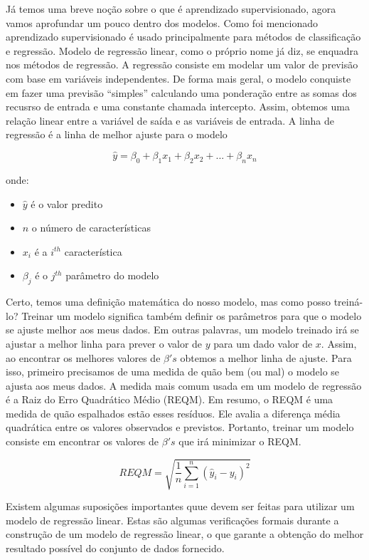 \documentclass[
  letterpaper,
  DIV=11,
  numbers=noendperiod]{scrreprt}
\begin{document}
Já temos uma breve noção sobre o que é aprendizado supervisionado, agora
vamos aprofundar um pouco dentro dos modelos. Como foi mencionado
aprendizado supervisionado é usado principalmente para métodos de
classificação e regressão. Modelo de regressão linear, como o próprio
nome já diz, se enquadra nos métodos de regressão. A regressão consiste
em modelar um valor de previsão com base em variáveis independentes. De
forma mais geral, o modelo conquiste em fazer uma previsão ``simples''
calculando uma ponderação entre as somas dos recusrso de entrada e uma
constante chamada intercepto. Assim, obtemos uma relação linear entre a
variável de saída e as variáveis de entrada. A linha de regressão é a
linha de melhor ajuste para o modelo

\[
\hat y = \beta_0 + \beta_1x_1 + \beta_2x_2 + ...+ \beta_nx_n
\]

onde:

\begin{itemize}
\item
  \(\hat y\) é o valor predito
\item
  \(n\) o número de características
\item
  \(x_i\) é a \(i^{th}\) característica
\item
  \(\beta_j\) é o \(j^{th}\) parâmetro do modelo
\end{itemize}

Certo, temos uma definição matemática do nosso modelo, mas como posso
treiná-lo? Treinar um modelo significa também definir os parâmetros para
que o modelo se ajuste melhor aos meus dados. Em outras palavras, um
modelo treinado irá se ajustar a melhor linha para prever o valor de
\(y\) para um dado valor de \(x\). Assim, ao encontrar os melhores
valores de \(\beta 's\) obtemos a melhor linha de ajuste. Para isso,
primeiro precisamos de uma medida de quão bem (ou mal) o modelo se
ajusta aos meus dados. A medida mais comum usada em um modelo de
regressão é a Raiz do Erro Quadrático Médio (REQM). Em resumo, o REQM é
uma medida de quão espalhados estão esses resíduos. Ele avalia a
diferença média quadrática entre os valores observados e previstos.
Portanto, treinar um modelo consiste em encontrar os valores de
\(\beta's\) que irá minimizar o REQM.

\[
REQM = \sqrt{\frac{1}{n}\sum_{i = 1}^{n}  (\hat y_i - y_i)^2}
\]

Existem algumas suposições importantes quue devem ser feitas para
utilizar um modelo de regressão linear. Estas são algumas verificações
formais durante a construção de um modelo de regressão linear, o que
garante a obtenção do melhor resultado possível do conjunto de dados
fornecido.
\end{document}
